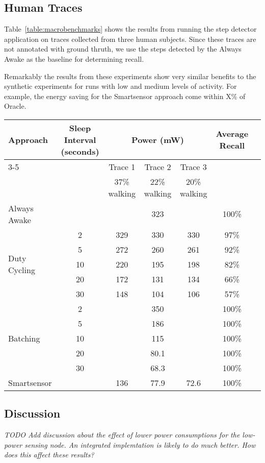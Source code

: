 \subsection{Human Traces}

Table~\ref{table:macrobenchmarks} shows the results from running the
step detector application on traces collected from three human
subjects.  Since these traces are not annotated with ground thruth, we
use the steps detected by the Always Awake as the baseline for
determining recall.

Remarkably the results from these experiments show very similar
benefits to the synthetic experiments for runs with low and medium
levels of activity.  For example, the energy saving for the
Smartsensor approach come within X\% of Oracle.


\begin{table*}[t]
\centering
    \begin{tabular}{|l|c|c|c|c|c|c|}
    \hline
	\multirow{2}{*}{Approach}		& \multirow{2}{*}{\parbox{2.2cm}{Sleep Interval (seconds)}}
												& \multicolumn{3}{c|}{\parbox{1.2cm}{Power (mW)}}
																								& \multirow{2}{*}{\parbox{1.5cm}{Average Recall}} \\ \cline{3-5}
									&			& Trace 1		& Trace 2		& Trace 3 		& 							\\ 
									&			& 37\% walking	& 22\% walking		& 20\% walking		& \\ \hline
	Always Awake					& 			& \multicolumn{3}{c|}{323} 						& 100\% \\ \hline
	\multirow{5}{*}{Duty Cycling}	& 2			& 329			& 330			& 330			& 97\%	\\ \cline{2-6}
									& 5			& 272			& 260			& 261			& 92\%	\\ \cline{2-6}
									& 10		& 220			& 195			& 198			& 82\%	\\ \cline{2-6}
									& 20		& 172			& 131			& 134			& 66\%	\\ \cline{2-6}
									& 30		& 148			& 104			& 106			& 57\%	\\ \hline
	\multirow{5}{*}{Batching}		& 2			& \multicolumn{3}{c|}{350} 						& 100\% \\ \cline{2-6}
									& 5			& \multicolumn{3}{c|}{186} 						& 100\% \\ \cline{2-6}
	 								& 10		& \multicolumn{3}{c|}{115} 						& 100\% \\ \cline{2-6}
	 								& 20		& \multicolumn{3}{c|}{80.1} 					& 100\% \\ \cline{2-6}
	 								& 30		& \multicolumn{3}{c|}{68.3} 					& 100\% \\ \hline
	Smartsensor				&			& 136			& 77.9			& 72.6			& 100\% \\ \hline
    \end{tabular}
	\caption{Summary of achieved recall and power consumption for each wake-up approach for macrobenchmarks}
	\label{table:macrobenchmarks}
\end{table*}

\subsection{Discussion}

{\em TODO Add discussion about the effect of lower power consumptions
  for the low-power sensing node.  An integrated implemtation is
  likely to do much better. How does this affect these results?}
